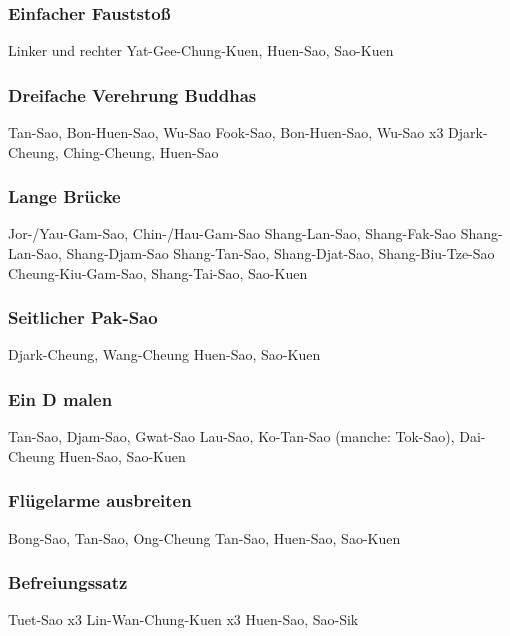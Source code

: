 \subsubsection{Einfacher Fauststo{\ss}} %

Linker und rechter Yat-Gee-Chung-Kuen, Huen-Sao, Sao-Kuen

\subsubsection{Dreifache Verehrung Buddhas} %

Tan-Sao, Bon-Huen-Sao, Wu-Sao
Fook-Sao, Bon-Huen-Sao, Wu-Sao x3
Djark-Cheung, Ching-Cheung, Huen-Sao

\subsubsection{Lange Br\"ucke} %

Jor-/Yau-Gam-Sao, Chin-/Hau-Gam-Sao
Shang-Lan-Sao, Shang-Fak-Sao
Shang-Lan-Sao, Shang-Djam-Sao
Shang-Tan-Sao, Shang-Djat-Sao, Shang-Biu-Tze-Sao
Cheung-Kiu-Gam-Sao, Shang-Tai-Sao, Sao-Kuen

\subsubsection{Seitlicher Pak-Sao} %

Djark-Cheung, Wang-Cheung
Huen-Sao, Sao-Kuen

\subsubsection{Ein D malen} %

Tan-Sao, Djam-Sao, Gwat-Sao
Lau-Sao, Ko-Tan-Sao (manche: Tok-Sao), Dai-Cheung
Huen-Sao, Sao-Kuen

\subsubsection{Fl\"ugelarme ausbreiten} %

Bong-Sao, Tan-Sao, Ong-Cheung
Tan-Sao, Huen-Sao, Sao-Kuen

\subsubsection{Befreiungssatz} %

Tuet-Sao x3
Lin-Wan-Chung-Kuen x3
Huen-Sao, Sao-Sik




